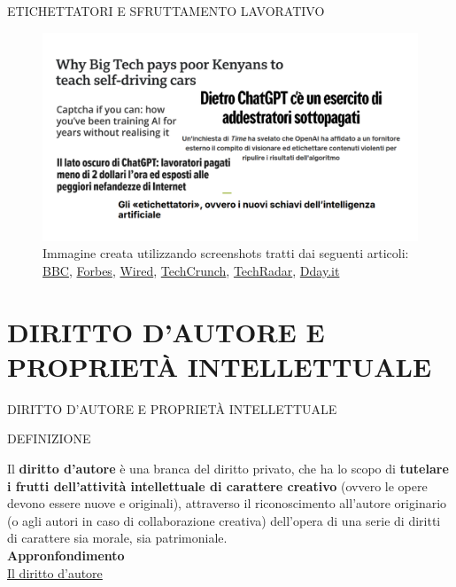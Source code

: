 \documentclass[aspectratio=1610]{beamer}
\begin{document}
\begin{frame}{ETICHETTATORI E SFRUTTAMENTO LAVORATIVO}
    \begin{figure}
        \includegraphics[width=.9\linewidth]{img/etichettatori.png}
        \caption{
            Immagine creata utilizzando screenshots tratti dai seguenti articoli:
            \href{https://www.bbc.com/news/technology-46055595}{BBC}, 
            \href{https://forbes.it/2019/06/19/intelligenza-artificiale-e-lavoro-etichettatori-nuovi-schiavi-silicon-valley}{Forbes}, 
            \href{https://www.wired.it/article/chatgpt-lavoratori-umani-addestramento-intelligenza-artificiale/}{Wired},
            \href{https://techcrunch.com/2025/10/01/meta-plans-to-sell-targeted-ads-based-on-data-in-your-ai-chats/}{TechCrunch}, 
            \href{https://www.techradar.com/news/captcha-if-you-can-how-youve-been-training-ai-for-years-without-realising-it}{TechRadar}, 
            \href{https://www.dday.it/redazione/44807/il-lato-oscuro-di-chatgpt-lavoratori-pagati-meno-di-2-dollari-lora-ed-esposti-alle-peggiori-nefandezze-di-internet}{Dday.it}
        }
    \end{figure}
\end{frame}

\section{DIRITTO D'AUTORE E PROPRIETÀ INTELLETTUALE}

\begin{frame}{DIRITTO D'AUTORE E PROPRIETÀ INTELLETTUALE}
    \begin{alertblock}{DEFINIZIONE}
        \begin{minipage}{0.96\linewidth}
            \justifying
            Il \textbf{diritto d'autore} è una branca del diritto privato, che ha lo scopo di 
            \textbf{tutelare i frutti dell'attività intellettuale di carattere creativo} (ovvero le opere 
            devono essere nuove e originali), attraverso il riconoscimento all'autore originario 
            (o agli autori in caso di collaborazione creativa) dell'opera di una serie di diritti 
            di carattere sia morale, sia patrimoniale.\\
            \bigskip
            \tiny{\textbf{Appronfondimento}}\\
            \tiny{\href{https://it.wikipedia.org/wiki/Diritto_d'autore}{Il diritto d'autore}}
        \end{minipage}
    \end{alertblock}
\end{frame}
\end{document}
